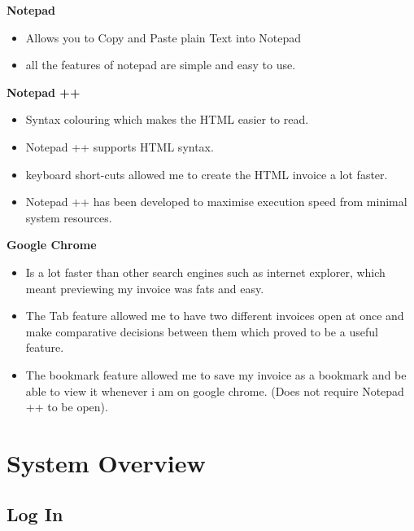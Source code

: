 \textbf{Notepad}
\begin{itemize}
	\item Allows you to Copy and Paste plain Text into Notepad
	\item all the features of notepad are simple and easy to use.
\end{itemize}
\vspace{5mm}

\textbf{Notepad ++}
\begin{itemize}
	\item Syntax colouring which makes the HTML easier to read.
	\item Notepad ++ supports HTML syntax.
	\item keyboard short-cuts allowed me to create the HTML invoice a lot faster.
	\item Notepad ++ has been developed to maximise execution speed from minimal system resources.
\end{itemize}
\vspace{5mm}

\textbf{Google Chrome}
\begin{itemize}
	\item Is a lot faster than other search engines such as internet explorer, which meant previewing my invoice was fats and easy.
	\item The Tab feature allowed me to have two different invoices open at once and make comparative decisions between them which proved to be a useful feature.
	\item The bookmark feature allowed me to save my invoice as a bookmark and be able to view it whenever i am on google chrome. (Does not require Notepad ++ to be open).
\end{itemize}

\section{System Overview}

\subsection{Log In}

